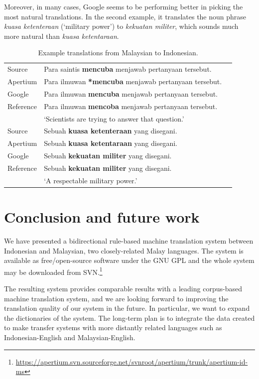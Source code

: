 \documentclass[10pt,a5paper,twoside]{article}
\begin{document}
Moreover, in many cases, Google seems to be performing better in picking the most natural translations. In the second example, it translates the noun phrase \emph{kuasa ketenteraan} (`military power') to \emph{kekuatan militer}, which sounds much more natural than \emph{kuasa ketentaraan}.

\begin{table}[htbp]
  \begin{center}
  \begin{tabular}{llc}
  \toprule
  Source & Para saintis \textbf{mencuba} menjawab pertanyaan tersebut.\\
  Apertium & Para ilmuwan \textbf{*mencuba} menjawab pertanyaan tersebut.\\
  Google & Para ilmuwan \textbf{mencuba} menjawab pertanyaan tersebut.\\
  Reference & Para ilmuwan \textbf{mencoba} menjawab pertanyaan tersebut.\\
  & `Scientists are trying to answer that question.'\\
  \midrule
  Source & Sebuah \textbf{kuasa ketenteraan} yang disegani.\\
  Apertium & Sebuah \textbf{kuasa ketentaraan} yang disegani.\\
  Google & Sebuah \textbf{kekuatan militer} yang disegani.\\
  Reference & Sebuah \textbf{kekuatan militer} yang disegani.\\
  & `A respectable military power.'\\
  \bottomrule
  \end{tabular}
    \caption{Example translations from Malaysian to Indonesian.}
    \label{table:ex}
  \end{center}
\end{table}

\section*{Conclusion and future work}
We have presented a bidirectional rule-based machine translation system between Indonesian and Malaysian, two closely-related Malay languages. The system is available as free/open-source software under the GNU GPL and the whole system may be downloaded from SVN.\footnote{\url{https://apertium.svn.sourceforge.net/svnroot/apertium/trunk/apertium-id-ms}}

The resulting system provides comparable results with a leading corpus-based machine translation system, and we are looking forward to improving the translation quality of our system in the future. In particular, we want to expand the dictionaries of the system. The long-term plan is to integrate the data created to make transfer systems with more distantly related languages such as Indonesian-English and Malaysian-English.
\end{document}
